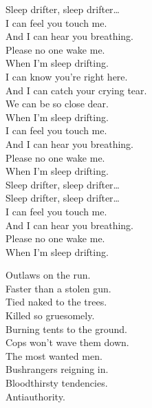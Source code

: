 Sleep drifter, sleep drifter… \\

I can feel you touch me. \\
And I can hear you breathing. \\
Please no one wake me. \\
When I'm sleep drifting. \\

I can know you're right here. \\
And I can catch your crying tear. \\
We can be so close dear. \\
When I'm sleep drifting. \\

I can feel you touch me. \\
And I can hear you breathing. \\
Please no one wake me. \\
When I'm sleep drifting. \\

Sleep drifter, sleep drifter… \\

Sleep drifter, sleep drifter… \\

I can feel you touch me. \\
And I can hear you breathing. \\
Please no one wake me. \\
When I'm sleep drifting. \\




Outlaws on the run. \\
Faster than a stolen gun. \\
Tied naked to the trees. \\
Killed so gruesomely. \\
Burning tents to the ground. \\
Cops won't wave them down. \\
The most wanted men. \\
Bushrangers reigning in. \\

Bloodthirsty tendencies. \\
Antiauthority. \\

